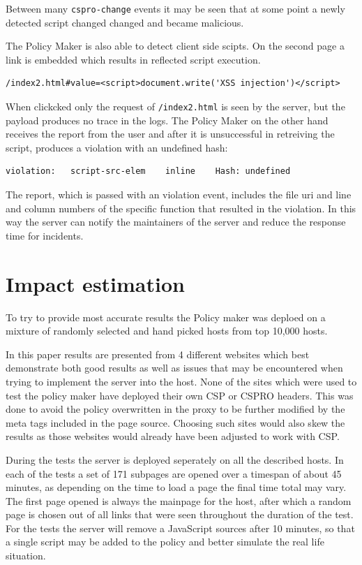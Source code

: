 Between many \texttt{cspro-change} events it may be seen that at some point a newly detected script changed changed and became malicious.

The Policy Maker is also able to detect client side scipts.
On the second page a link is embedded which results in reflected script execution.
\begin{verbatim}
/index2.html#value=<script>document.write('XSS injection')</script>
\end{verbatim}
When clickcked only the request of \texttt{/index2.html} is seen by the server, but the payload produces no trace in the logs.
The Policy Maker on the other hand receives the report from the user and after it is unsuccessful in retreiving the script, produces a violation with an undefined hash:
\begin{verbatim}
violation:   script-src-elem    inline    Hash: undefined
\end{verbatim}
The report, which is passed with an violation event, includes the file uri and line and column numbers of the specific function that resulted in the violation.
In this way the server can notify the maintainers of the server and reduce the response time for incidents.

\section{Impact estimation}

To try to provide most accurate results the Policy maker was deploed on a mixture of randomly selected and hand picked hosts from top 10,000 hosts.

In this paper results are presented from 4 different websites which best demonstrate both good results as well as issues that may be encountered when trying to implement the server into the host.
None of the sites which were used to test the policy maker have deployed their own CSP or CSPRO headers.
This was done to avoid the policy overwritten in the proxy to be further modified by the meta tags included in the page source.
Choosing such sites would also skew the results as those websites would already have been adjusted to work with CSP.

During the tests the server is deployed seperately on all the described hosts.
In each of the tests a set of 171 subpages are opened over a timespan of about 45 minutes, as depending on the time to load a page the final time total may vary. 
The first page opened is always the mainpage for the host, after which a random page is chosen out of all links that were seen throughout the duration of the test.
For the tests the server will remove a JavaScript sources after 10 minutes, so that a single script may be added to the policy and better simulate the real life situation.

